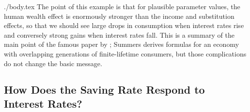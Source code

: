 \documentclass{handout}
\begin{document}
\begin{verbatimwrite}{./body.tex}
The point of this example is that for plausible parameter values, the
human wealth effect is enormously stronger than the income and
substitution effects, so that we should see large drops in consumption
when interest rates rise and conversely strong gains when interest
rates fall.  This is a summary of the main point of the famous paper
by \cite{summersCapTax}; Summers derives formulas for an economy with
overlapping generations of finite-lifetime consumers, but those
complications do not change the basic message.

\subsection{How Does the Saving Rate Respond to Interest Rates?} %


\end{verbatimwrite}
\end{document}
